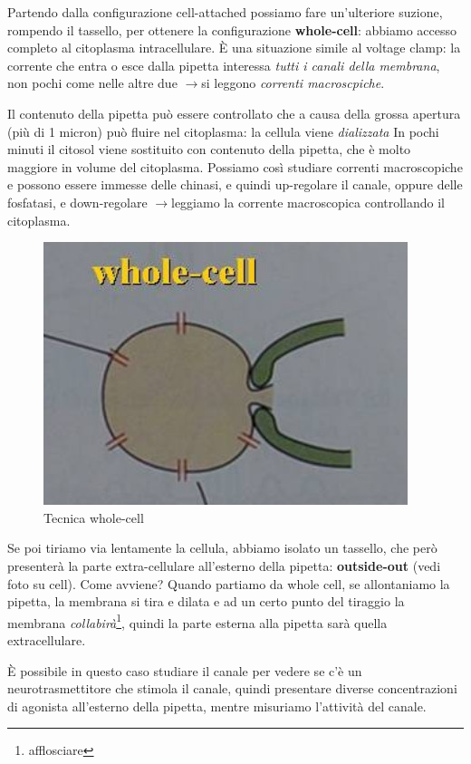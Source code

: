 \documentclass[a4paper,12pt]{article}
\newcommand{\lfreccia}{\ensuremath{\longrightarrow}}
\begin{document}
Partendo dalla configurazione cell-attached possiamo fare un'ulteriore suzione, rompendo il tassello, per ottenere la configurazione \textbf{whole-cell}: abbiamo accesso completo al citoplasma intracellulare. È una situazione simile al voltage clamp: la corrente che entra o esce dalla pipetta interessa \emph{tutti i canali della membrana}, non pochi come nelle altre due \lfreccia si leggono \emph{correnti macroscpiche}.

Il contenuto della pipetta può essere controllato che a causa della grossa apertura (più di 1 micron) può fluire nel citoplasma: la cellula viene \emph{dializzata}  In pochi minuti il citosol viene sostituito con contenuto della pipetta, che è molto maggiore in volume del citoplasma. Possiamo così studiare correnti macroscopiche e possono essere immesse delle chinasi, e quindi up-regolare il canale, oppure delle fosfatasi, e down-regolare \lfreccia leggiamo la corrente macroscopica controllando il citoplasma.

\begin{figure}[H]
\centering
\includegraphics[scale=0.35]{immagine/whole.jpg}
\caption{Tecnica whole-cell}
\end{figure}

Se poi tiriamo via lentamente la cellula, abbiamo isolato un tassello, che però presenterà la parte extra-cellulare all'esterno della pipetta: \textbf{outside-out} (vedi foto su cell).
Come avviene? Quando partiamo da whole cell, se allontaniamo la pipetta, la membrana si tira e dilata e ad un certo punto del tiraggio la membrana \emph{collabirà}\footnote{afflosciare}, quindi la parte esterna alla pipetta sarà quella extracellulare. 

È possibile in questo caso studiare il canale per vedere se c'è un neurotrasmettitore che stimola il canale, quindi presentare diverse concentrazioni di agonista all'esterno della pipetta, mentre misuriamo l'attività del canale.
\end{document}
